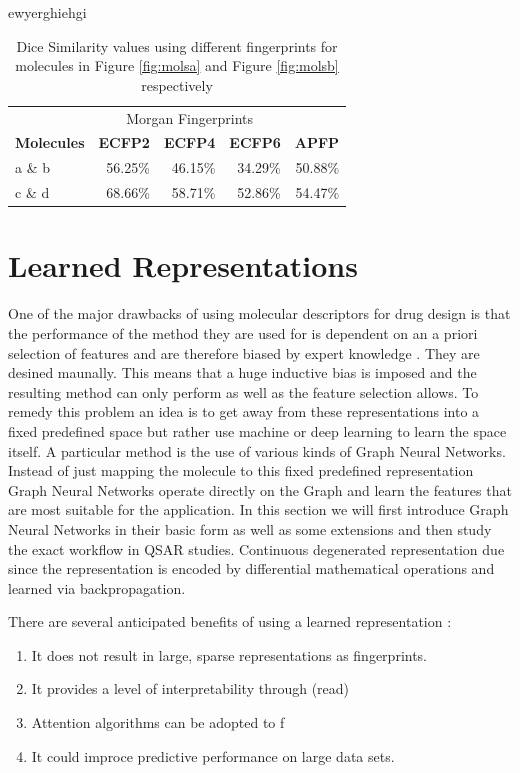 ewyerghiehgi
\begin{table}[h]
	\centering
	\begin{tabularx}{0.57\textwidth}{l
			r
			r 
			r
			r
		}
		\toprule
		& \multicolumn{3}{c}{Morgan Fingerprints} &   \\
		\cmidrule(r){2-4} 
		\bf{Molecules}  &  \multicolumn{1}{c}{\bf{ECFP2}}   & \multicolumn{1}{c}{\bf{ECFP4}}&  \multicolumn{1}{c}{\bf{ECFP6}} & \multicolumn{1}{c}{\bf{APFP}} \\
		\midrule
		a \& b   & 56.25\%   &  46.15\%  & 34.29\%    & 50.88\%   \\
		
		c \& d   & 68.66\%  &  58.71\% &  52.86\%  & 54.47\% \\
		
		
		\bottomrule
	\end{tabularx}
	
	
	\caption{Dice Similarity values using different fingerprints for molecules in Figure \ref{fig:molsa} and Figure \ref{fig:molsb} respectively}
	\label{tab:dis_metric_2Dshapes}
\end{table}

\section{Learned Representations}
One of the major drawbacks of using molecular descriptors for drug design is that the performance of the method they are used for is dependent on an a priori selection of features and are therefore biased by expert knowledge \cite{merkwirth}. They are desined maunally. This means that a huge inductive bias is imposed and the resulting method can only perform as well as the feature selection allows. To remedy this problem an idea is to get away from these representations into a fixed predefined space but rather use machine or deep learning to learn the space itself. A particular method is the use of various kinds of Graph Neural Networks. Instead of just mapping the molecule to this fixed predefined representation Graph Neural Networks operate directly on the Graph and learn the features that are most suitable for the application. In this section we will first introduce Graph Neural Networks in their basic form as well as some extensions and then study the exact workflow in QSAR studies. Continuous degenerated representation due since the representation is encoded by differential mathematical operations and learned via backpropagation.

There are several anticipated benefits of using a learned representation \citep{SHEN201929}:
\begin{enumerate}
	\item It does not result in large, sparse representations as fingerprints.
	\item It provides a level of interpretability through \citep{duvenaud2015convolutional} (read)
	\item Attention algorithms can be adopted to f \citep{deepchemstable, graphattentionmpp}
	\item It could improce predictive performance on large data sets. \citep{yangMPP}
\end{enumerate}

